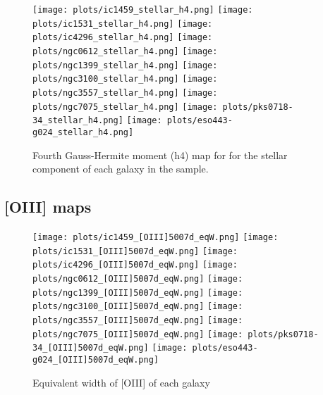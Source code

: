 \documentclass[fleqn,usenatbib,useAMS]{mnras}
\begin{document}
		\begin{figure*}
			\centering
			\texttt{[image: plots/ic1459\_stellar\_h4.png]}
			\texttt{[image: plots/ic1531\_stellar\_h4.png]}
			\texttt{[image: plots/ic4296\_stellar\_h4.png]}
			\texttt{[image: plots/ngc0612\_stellar\_h4.png]}
			\texttt{[image: plots/ngc1399\_stellar\_h4.png]}
			\texttt{[image: plots/ngc3100\_stellar\_h4.png]}
			\texttt{[image: plots/ngc3557\_stellar\_h4.png]}
			\texttt{[image: plots/ngc7075\_stellar\_h4.png]}
			\texttt{[image: plots/pks0718-34\_stellar\_h4.png]}
			\texttt{[image: plots/eso443-g024\_stellar\_h4.png]}
			\caption{Fourth Gauss-Hermite moment (h4) map for for the stellar component of each galaxy in the sample.}
			\label{fig:stellar_h4}
		\end{figure*}



	\subsection{[OIII] maps}
		\label{subsec:OIIImaps}

		\begin{figure*}
			\centering
			\texttt{[image: plots/ic1459\_[OIII]5007d\_eqW.png]}
			\texttt{[image: plots/ic1531\_[OIII]5007d\_eqW.png]}
			\texttt{[image: plots/ic4296\_[OIII]5007d\_eqW.png]}
			\texttt{[image: plots/ngc0612\_[OIII]5007d\_eqW.png]}
			\texttt{[image: plots/ngc1399\_[OIII]5007d\_eqW.png]}
			\texttt{[image: plots/ngc3100\_[OIII]5007d\_eqW.png]}
			\texttt{[image: plots/ngc3557\_[OIII]5007d\_eqW.png]}
			\texttt{[image: plots/ngc7075\_[OIII]5007d\_eqW.png]}
			\texttt{[image: plots/pks0718-34\_[OIII]5007d\_eqW.png]}
			\texttt{[image: plots/eso443-g024\_[OIII]5007d\_eqW.png]}
			\caption{Equivalent width of [OIII] of each galaxy}
			\label{fig:OIII_eqw}
		\end{figure*}
\end{document}

